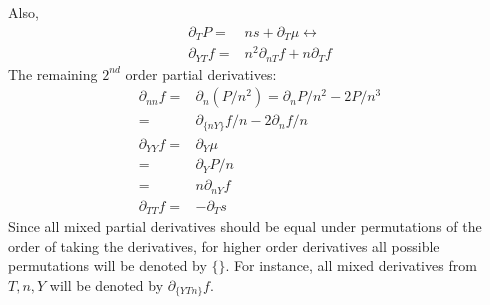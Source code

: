 \documentclass[11pt,letter]{article}
\begin{document}
Also,
\begin{equation}
 \begin{split}
 \partial_T P =& n s+\partial_T \mu \leftrightarrow \\
  \partial_{YT}f=&n^2\partial_{nT}f+n\partial_{T}f
 \end{split}
\end{equation}
The remaining $2^{nd}$ order partial derivatives:
\begin{equation}
 \begin{split}
 \partial_{nn} f =&\partial_n (P/n^2) =\partial_n P/n^2 - 2 P/n^3\\
  =&\partial_{\{nY\}}f/n - 2 \partial_{n}f/n\\
  \partial_{YY}f=&\partial_{Y}\mu\\
  =&\partial_{Y}P/n\\
  =&n\partial_{nY}f\\
  \partial_{TT}f=&-\partial_Ts
 \end{split}
\end{equation}
Since all mixed partial derivatives should be equal under permutations of the order of taking the derivatives, for higher order derivatives
all possible permutations will be denoted by $\{\}$. 
For instance, all mixed derivatives from $T,n,Y$ will be denoted by $\partial_{\{YTn\}}f$.
\end{document}
